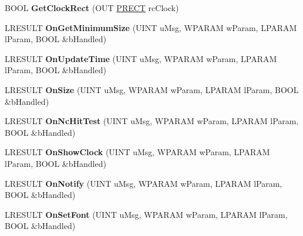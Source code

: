 \begin{DoxyCompactItemize}
\item 
\mbox{\label{class_c_tray_notify_wnd_aa8d3c11ae1656c6ae474410c39b5f006}} 
B\+O\+OL {\bfseries Get\+Clock\+Rect} (O\+UT \hyperlink{structtag_r_e_c_t}{P\+R\+E\+CT} rc\+Clock)
\item 
\mbox{\label{class_c_tray_notify_wnd_a647a3d2ad08f5d9dd0d9dbb43f224824}} 
L\+R\+E\+S\+U\+LT {\bfseries On\+Get\+Minimum\+Size} (U\+I\+NT u\+Msg, W\+P\+A\+R\+AM w\+Param, L\+P\+A\+R\+AM l\+Param, B\+O\+OL \&b\+Handled)
\item 
\mbox{\label{class_c_tray_notify_wnd_aa560c43b1af3288adfeeda317ca1be62}} 
L\+R\+E\+S\+U\+LT {\bfseries On\+Update\+Time} (U\+I\+NT u\+Msg, W\+P\+A\+R\+AM w\+Param, L\+P\+A\+R\+AM l\+Param, B\+O\+OL \&b\+Handled)
\item 
\mbox{\label{class_c_tray_notify_wnd_aa3762f18f6a85b0920a91af0a2a5aab1}} 
L\+R\+E\+S\+U\+LT {\bfseries On\+Size} (U\+I\+NT u\+Msg, W\+P\+A\+R\+AM w\+Param, L\+P\+A\+R\+AM l\+Param, B\+O\+OL \&b\+Handled)
\item 
\mbox{\label{class_c_tray_notify_wnd_a605895e4b9151b48cb9cdfbf1fce2e5c}} 
L\+R\+E\+S\+U\+LT {\bfseries On\+Nc\+Hit\+Test} (U\+I\+NT u\+Msg, W\+P\+A\+R\+AM w\+Param, L\+P\+A\+R\+AM l\+Param, B\+O\+OL \&b\+Handled)
\item 
\mbox{\label{class_c_tray_notify_wnd_aac8d414f8ae34ce57744dcc1d2d7b35f}} 
L\+R\+E\+S\+U\+LT {\bfseries On\+Show\+Clock} (U\+I\+NT u\+Msg, W\+P\+A\+R\+AM w\+Param, L\+P\+A\+R\+AM l\+Param, B\+O\+OL \&b\+Handled)
\item 
\mbox{\label{class_c_tray_notify_wnd_a738035cf4e376296644611935df1792d}} 
L\+R\+E\+S\+U\+LT {\bfseries On\+Notify} (U\+I\+NT u\+Msg, W\+P\+A\+R\+AM w\+Param, L\+P\+A\+R\+AM l\+Param, B\+O\+OL \&b\+Handled)
\item 
\mbox{\label{class_c_tray_notify_wnd_a666e8eb053dcb425556c51f5496c140d}} 
L\+R\+E\+S\+U\+LT {\bfseries On\+Set\+Font} (U\+I\+NT u\+Msg, W\+P\+A\+R\+AM w\+Param, L\+P\+A\+R\+AM l\+Param, B\+O\+OL \&b\+Handled)
\item 

\end{DoxyCompactItemize}
